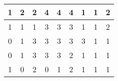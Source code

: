 \documentclass[10pt,notitlepage]{amsart}
\begin{document}
\begin{center}
\begin{tabular}{|c|c|c|c|c|c|c|c|c|}
  \hline    
  1&\cellcolor{red!25}2&2&\cellcolor{blue!25}4&\cellcolor{blue!25}4&\cellcolor{blue!25}4&1&1&\cellcolor{red!25}2\\
    \hline
  1&1&1&\cellcolor{green!25}3&\cellcolor{green!25}3&\cellcolor{green!25}3&1&1&\cellcolor{red!25}2\\
    \hline
  0&1&\cellcolor{green!25}3&\cellcolor{green!25}3&\cellcolor{green!25}3&\cellcolor{green!25}3&\cellcolor{green!25}3&1&1\\
    \hline
  0&1&\cellcolor{green!25}3&\cellcolor{green!25}3&\cellcolor{green!25}3&\cellcolor{red!25}2&1&1&1\\
    \hline
  1&0&\cellcolor{red!25}2&0&1&\cellcolor{red!25}2&1&1&1\\              
  \hline
\end{tabular} 
\end{center}
\end{document}
